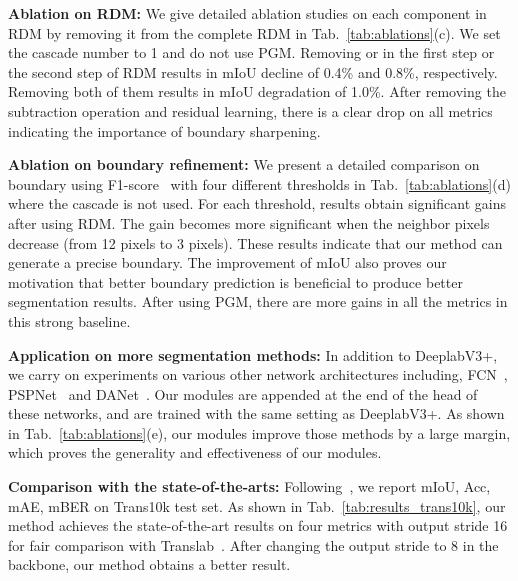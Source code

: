 \noindent \textbf{Ablation on RDM:} We give detailed ablation studies on each component in RDM by removing it from the complete RDM in Tab.~\ref{tab:ablations}(c). We set the cascade number to 1 and do not use PGM. Removing  or  in the first step or the second step of RDM results in mIoU decline of 0.4\% and 0.8\%, respectively. Removing both of them results in mIoU degradation of 1.0\%. After removing the subtraction operation and residual learning, there is a clear drop on all metrics indicating the importance of boundary sharpening.

\noindent \textbf{Ablation on boundary refinement:} We present a detailed comparison on boundary using F1-score~\cite{gated-scnn} with four different thresholds in Tab.~\ref{tab:ablations}(d) where the cascade is not used. For each threshold, results obtain significant gains after using RDM. The gain becomes more significant when the neighbor pixels decrease (from 12 pixels to 3 pixels). These results indicate that our method can generate a precise boundary. The improvement of mIoU also proves our motivation that better boundary prediction is beneficial to produce better segmentation results. After using PGM, there are more gains in all the metrics in this strong baseline.

\noindent \textbf{Application on more segmentation methods:} In addition to DeeplabV3+, we carry on experiments on various other network architectures including,
 FCN~\cite{fcn}, PSPNet~\cite{pspnet} and DANet~\cite{DAnet}. Our modules are appended at the end of the head of these networks, and are trained with the same setting as DeeplabV3+. As shown in Tab.~\ref{tab:ablations}(e), our modules improve those methods by a large margin, which proves the generality and effectiveness of our modules.















\noindent \textbf{Comparison with the state-of-the-arts:} Following~\cite{trans10k_xieenze}, we report mIoU, Acc, mAE, mBER on Trans10k test set. As shown in Tab.~\ref{tab:results_trans10k}, our method achieves the state-of-the-art results on four metrics with output stride 16 for fair comparison with Translab~\cite{trans10k_xieenze}. After changing the output stride to 8 in the backbone, our method obtains a better result.





